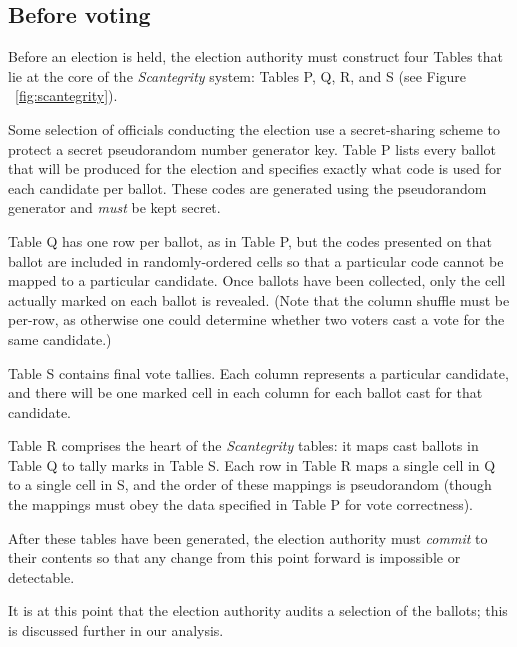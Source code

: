 \documentclass[10pt,twocolumn]{article}
\newcommand{\term}[1]{\textit{#1}}
\begin{document}
\subsection{Before voting}

Before an election is held, the election authority must construct four Tables that lie at the core
of the \term{Scantegrity} system: Tables P, Q, R, and S (see Figure ~\ref{fig:scantegrity}).

Some selection of officials conducting the election use a secret-sharing scheme to protect a
secret pseudorandom number generator key. Table P lists every ballot that will be produced for the
election and specifies exactly what code is used for each candidate per ballot. These codes are
generated using the pseudorandom generator and \emph{must} be kept secret.

Table Q has one row per ballot, as in Table P, but the codes presented on that ballot are included
in randomly-ordered cells so that a particular code cannot be mapped to a particular candidate.
Once ballots have been collected, only the cell actually marked on each ballot is revealed. (Note
that the column shuffle must be per-row, as otherwise one could determine whether two voters
cast a vote for the same candidate.)

Table S contains final vote tallies. Each column represents a particular candidate, and there will
be one marked cell in each column for each ballot cast for that candidate.

Table R comprises the heart of the \term{Scantegrity} tables: it maps cast ballots in Table Q to tally marks
in Table S. Each row in Table R maps a single cell in Q to a single cell in S, and the order of
these mappings is pseudorandom (though the mappings must obey the data specified in Table P for vote
correctness).

After these tables have been generated, the election authority must \term{commit} to their contents
so that any change from this point forward is impossible or detectable.

It is at this point that the election authority audits a selection of the ballots; this is discussed
further in our analysis.
\end{document}
